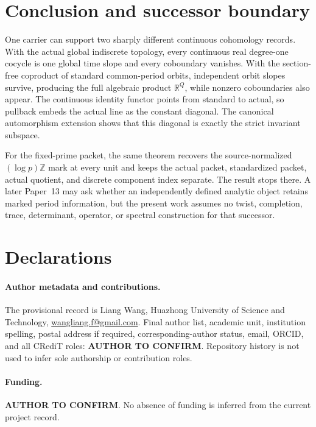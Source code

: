 \documentclass[11pt]{article}
\theoremstyle{definition}
\newcommand{\R}{\mathbb R}
\newcommand{\Z}{\mathbb Z}
\begin{document}
\section{Conclusion and successor boundary}
\label{sec:conclusion}

One carrier can support two sharply different continuous cohomology records.
With the actual global indiscrete topology, every continuous real
degree-one cocycle is one global time slope and every coboundary vanishes.
With the section-free coproduct of standard common-period orbits, independent
orbit slopes survive, producing the full algebraic product $\R^Q$, while
nonzero coboundaries also appear.  The continuous identity functor points
from standard to actual, so pullback embeds the actual line as the constant
diagonal.  The canonical automorphism extension shows that this diagonal is
exactly the strict invariant subspace.

For the fixed-prime packet, the same theorem recovers the source-normalized
$(\log p)\Z$ mark at every unit and keeps the actual packet, standardized
packet, actual quotient, and discrete component index separate.  The result
stops there.  A later Paper~13 may ask whether an independently defined
analytic object retains marked period information, but the present work
assumes no twist, completion, trace, determinant, operator, or spectral
construction for that successor.

\section*{Declarations}

\paragraph{Author metadata and contributions.}
The provisional record is Liang Wang, Huazhong University of Science and
Technology, \href{mailto:wangliang.f@gmail.com}{wangliang.f@gmail.com}.
Final author list, academic unit, institution spelling, postal address if
required, corresponding-author status, email, ORCID, and all CRediT roles:
\textbf{AUTHOR TO CONFIRM}.  Repository history is not used to infer sole
authorship or contribution roles.

\paragraph{Funding.}
\textbf{AUTHOR TO CONFIRM}.  No absence of funding is inferred from the
current project record.
\end{document}
